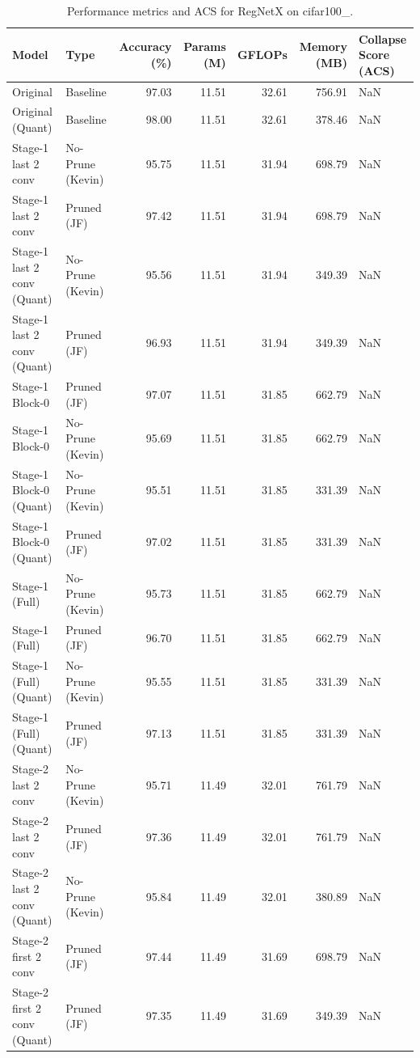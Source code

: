 \begin{table}
\caption{Performance metrics and ACS for RegNetX on cifar100_.}
\label{tab:RegNetX_cifar100_}
\begin{tabular}{llrrrrl}
\toprule
Model & Type & Accuracy (\%) & Params (M) & GFLOPs & Memory (MB) & Collapse Score (ACS) \\
\midrule
Original & Baseline & 97.03 & 11.51 & 32.61 & 756.91 & NaN \\
Original
(Quant) & Baseline & 98.00 & 11.51 & 32.61 & 378.46 & NaN \\
Stage-1 last 2 conv & No-Prune (Kevin) & 95.75 & 11.51 & 31.94 & 698.79 & NaN \\
Stage-1 last 2 conv & Pruned (JF) & 97.42 & 11.51 & 31.94 & 698.79 & NaN \\
Stage-1 last 2 conv
(Quant) & No-Prune (Kevin) & 95.56 & 11.51 & 31.94 & 349.39 & NaN \\
Stage-1 last 2 conv
(Quant) & Pruned (JF) & 96.93 & 11.51 & 31.94 & 349.39 & NaN \\
Stage-1 Block-0 & Pruned (JF) & 97.07 & 11.51 & 31.85 & 662.79 & NaN \\
Stage-1 Block-0 & No-Prune (Kevin) & 95.69 & 11.51 & 31.85 & 662.79 & NaN \\
Stage-1 Block-0
(Quant) & No-Prune (Kevin) & 95.51 & 11.51 & 31.85 & 331.39 & NaN \\
Stage-1 Block-0
(Quant) & Pruned (JF) & 97.02 & 11.51 & 31.85 & 331.39 & NaN \\
Stage-1 (Full) & No-Prune (Kevin) & 95.73 & 11.51 & 31.85 & 662.79 & NaN \\
Stage-1 (Full) & Pruned (JF) & 96.70 & 11.51 & 31.85 & 662.79 & NaN \\
Stage-1 (Full)
(Quant) & No-Prune (Kevin) & 95.55 & 11.51 & 31.85 & 331.39 & NaN \\
Stage-1 (Full)
(Quant) & Pruned (JF) & 97.13 & 11.51 & 31.85 & 331.39 & NaN \\
Stage-2 last 2 conv & No-Prune (Kevin) & 95.71 & 11.49 & 32.01 & 761.79 & NaN \\
Stage-2 last 2 conv & Pruned (JF) & 97.36 & 11.49 & 32.01 & 761.79 & NaN \\
Stage-2 last 2 conv
(Quant) & No-Prune (Kevin) & 95.84 & 11.49 & 32.01 & 380.89 & NaN \\
Stage-2 first 2 conv & Pruned (JF) & 97.44 & 11.49 & 31.69 & 698.79 & NaN \\
Stage-2 first 2 conv
(Quant) & Pruned (JF) & 97.35 & 11.49 & 31.69 & 349.39 & NaN \\

\end{tabular}
\end{table}
